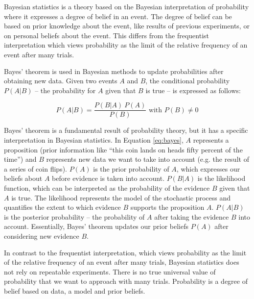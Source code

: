Bayesian statistics is a theory based on the Bayesian interpretation of probability where it expresses a degree of belief in an event. The degree of belief can be based on prior knowledge about the event, like results of previous experiments, or on personal beliefs about the event. This differs from the frequentist interpretation which views probability as the limit of the relative frequency of an event after many trials.\cite{bayes_1}

Bayes' theorem is used in Bayesian methods to update probabilities after obtaining new data. Given two events $A$ and $B$, the conditional probability $P(A|B)$ -- the probability for $A$ given that $B$ is true -- is expressed as follows:\cite{bayes_1}

\begin{equation}
\label{eq:bayes}
    P(A|B) = \frac{P(B|A)\ P(A)}{P(B)} \textrm{  with  } P(B) \ne 0
\end{equation}

Bayes' theorem is a fundamental result of probability theory, but it has a specific interpretation in Bayesian statistics. In Equation \ref{eq:bayes}, $A$ represents a proposition (prior information like ``this coin lands on heads fifty percent of the time'') and $B$ represents new data we want to take into account (e.g. the result of a series of coin flips). $P(A)$ is the prior probability of $A$, which expresses our beliefs about $A$ before evidence is taken into account. $P(B|A)$ is the likelihood function, which can be interpreted as the probability of the evidence $B$ given that $A$ is true. The likelihood represents the model of the stochastic process and quantifies the extent to which evidence $B$ supports the proposition $A$. $P(A|B)$ is the posterior probability -- the probability of $A$ after taking the evidence $B$ into account. Essentially, Bayes' theorem updates our prior beliefs $P(A)$ after considering new evidence $B$.\cite{bayes_1}

In contrast to the frequentist interpretation, which views probability as the limit of the relative frequency of an event after many trials, Bayesian statistics does not rely on repeatable experiments. There is no true universal value of probability that we want to approach with many trials. Probability is a degree of belief based on data, a model and prior beliefs.
